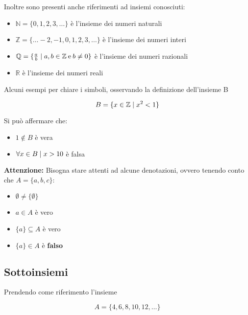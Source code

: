 \documentclass[12pt,a4paper]{article}
\newcommand{\Setsuchthat}{\;\ifnum\currentgrouptype=16 \middle\fi|\;}
\begin{document}
  Inoltre sono presenti anche riferimenti ad insiemi conosciuti:

  \begin{itemize}
    \item $ \mathbb{N} = \{0, 1, 2, 3, \ldots\} $ è l'insieme dei numeri naturali
    \item $ \mathbb{Z} = \{ \ldots -2, -1, 0, 1, 2, 3, \ldots\} $ è l'insieme dei numeri interi
    \item $ \mathbb{Q}  = \{\frac{a}{b} \Setsuchthat a,b \in \mathbb{Z}\:\text{e}\:b \neq 0\} $ è l'insieme dei numeri razionali
    \item $ \mathbb{R} $ è l'insieme dei numeri reali
  \end{itemize}

  Alcuni esempi per chiare i simboli, osservando la definizione dell'insieme B

  \begin{equation}
    B = \{x \in \mathbb{Z} \Setsuchthat x^{2} < 1\}
  \end{equation}

  Si può affermare che:
  \begin{itemize}
    \item $ 1 \notin B $ è vera
    \item $ \forall x \in B \Setsuchthat x > 10 $ è falsa
    \\[\baselineskip]
  \end{itemize}

  \textbf{Attenzione:} Bisogna stare attenti ad alcune denotazioni, ovvero tenendo conto che $ A = \{a, b, c\} $:

  \begin{itemize}
    \item $ \emptyset \neq \{\emptyset\} $
    \item $ a \in A $ è vero
    \item $ \{a\} \subseteq A $ è vero
    \item $ \{a\} \in A $ è \textbf{falso}
  \end{itemize}

  \subsection{Sottoinsiemi}
  Prendendo come riferimento l'insieme

  \begin{equation}
    A = \{4, 6, 8, 10, 12, \ldots\}
  \end{equation}
\end{document}
